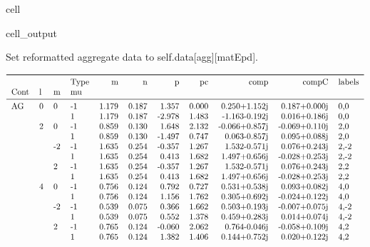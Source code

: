 \documentclass[letterpaper,table,10pt,english]{jupyterBook}
\begin{document}
\begin{sphinxuseclass}{cell}
\begin{sphinxVerbatimOutput}
\begin{sphinxuseclass}{cell_output}
\begin{sphinxVerbatim}[commandchars=\\\{\}]
Set reformatted aggregate data to self.data[agg][matEpd].
\end{sphinxVerbatim}
\begin{equation*}
\begin{split}\begin{tabular}{llllrrrrrrl}
\toprule
    &   &    & Type &      m &      n &      p &     pc &          comp &         compC & labels \\
Cont & l & m & mu &        &        &        &        &               &               &        \\
\midrule
AG & 0 &  0 & -1 &  1.179 &  0.187 &  1.357 &  0.000 &  0.250+1.152j &  0.187+0.000j &    0,0 \\
    &   &    &  1 &  1.179 &  0.187 & -2.978 &  1.483 & -1.163-0.192j &  0.016+0.186j &    0,0 \\
    & 2 &  0 & -1 &  0.859 &  0.130 &  1.648 &  2.132 & -0.066+0.857j & -0.069+0.110j &    2,0 \\
    &   &    &  1 &  0.859 &  0.130 & -1.497 &  0.747 &  0.063-0.857j &  0.095+0.088j &    2,0 \\
    &   & -2 & -1 &  1.635 &  0.254 & -0.357 &  1.267 &  1.532-0.571j &  0.076+0.243j &   2,-2 \\
    &   &    &  1 &  1.635 &  0.254 &  0.413 &  1.682 &  1.497+0.656j & -0.028+0.253j &   2,-2 \\
    &   &  2 & -1 &  1.635 &  0.254 & -0.357 &  1.267 &  1.532-0.571j &  0.076+0.243j &    2,2 \\
    &   &    &  1 &  1.635 &  0.254 &  0.413 &  1.682 &  1.497+0.656j & -0.028+0.253j &    2,2 \\
    & 4 &  0 & -1 &  0.756 &  0.124 &  0.792 &  0.727 &  0.531+0.538j &  0.093+0.082j &    4,0 \\
    &   &    &  1 &  0.756 &  0.124 &  1.156 &  1.762 &  0.305+0.692j & -0.024+0.122j &    4,0 \\
    &   & -2 & -1 &  0.539 &  0.075 &  0.366 &  1.662 &  0.503+0.193j & -0.007+0.075j &   4,-2 \\
    &   &    &  1 &  0.539 &  0.075 &  0.552 &  1.378 &  0.459+0.283j &  0.014+0.074j &   4,-2 \\
    &   &  2 & -1 &  0.765 &  0.124 & -0.060 &  2.062 &  0.764-0.046j & -0.058+0.109j &    4,2 \\
    &   &    &  1 &  0.765 &  0.124 &  1.382 &  1.406 &  0.144+0.752j &  0.020+0.122j &    4,2 \\

\end{tabular}
\end{split}
\end{equation*}
\end{sphinxuseclass}
\end{sphinxVerbatimOutput}
\end{sphinxuseclass}
\end{document}

